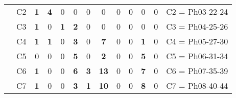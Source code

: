 \begin{table}[H]
{\begin{tabular}{|ccccccccccccc|}
\multicolumn{1}{|c|}{}                                      & \multicolumn{1}{c|}{C2} & \multicolumn{1}{c|}{\textbf{1}} & \multicolumn{1}{c|}{\textbf{4}} & \multicolumn{1}{c|}{0}          & \multicolumn{1}{c|}{0}          & \multicolumn{1}{c|}{0}          & \multicolumn{1}{c|}{0}           & \multicolumn{1}{c|}{0}          & \multicolumn{1}{c|}{0}  & \multicolumn{1}{c|}{0}           & \multicolumn{1}{c|}{0}          & C2 = Ph03-22-24   \\ \cline{2-13}
\multicolumn{1}{|c|}{}                                      & \multicolumn{1}{c|}{C3} & \multicolumn{1}{c|}{\textbf{1}} & \multicolumn{1}{c|}{0}          & \multicolumn{1}{c|}{\textbf{1}} & \multicolumn{1}{c|}{\textbf{2}} & \multicolumn{1}{c|}{0}          & \multicolumn{1}{c|}{0}           & \multicolumn{1}{c|}{0}          & \multicolumn{1}{c|}{0}  & \multicolumn{1}{c|}{0}           & \multicolumn{1}{c|}{0}          & C3 = Ph04-25-26   \\ \cline{2-13}
\multicolumn{1}{|c|}{}                                      & \multicolumn{1}{c|}{C4} & \multicolumn{1}{c|}{\textbf{1}} & \multicolumn{1}{c|}{\textbf{1}} & \multicolumn{1}{c|}{0}          & \multicolumn{1}{c|}{\textbf{3}} & \multicolumn{1}{c|}{0}          & \multicolumn{1}{c|}{\textbf{7}}  & \multicolumn{1}{c|}{0}          & \multicolumn{1}{c|}{0}  & \multicolumn{1}{c|}{\textbf{1}}  & \multicolumn{1}{c|}{0}          & C4 = Ph05-27-30   \\ \cline{2-13}
\multicolumn{1}{|c|}{}                                      & \multicolumn{1}{c|}{C5} & \multicolumn{1}{c|}{0}          & \multicolumn{1}{c|}{0}          & \multicolumn{1}{c|}{0}          & \multicolumn{1}{c|}{\textbf{5}} & \multicolumn{1}{c|}{0}          & \multicolumn{1}{c|}{\textbf{2}}  & \multicolumn{1}{c|}{0}          & \multicolumn{1}{c|}{0}  & \multicolumn{1}{c|}{\textbf{5}}  & \multicolumn{1}{c|}{0}          & C5 = Ph06-31-34   \\ \cline{2-13}
\multicolumn{1}{|c|}{}                                      & \multicolumn{1}{c|}{C6} & \multicolumn{1}{c|}{\textbf{1}} & \multicolumn{1}{c|}{0}          & \multicolumn{1}{c|}{0}          & \multicolumn{1}{c|}{\textbf{6}} & \multicolumn{1}{c|}{\textbf{3}} & \multicolumn{1}{c|}{\textbf{13}} & \multicolumn{1}{c|}{0}          & \multicolumn{1}{c|}{0}  & \multicolumn{1}{c|}{\textbf{7}}  & \multicolumn{1}{c|}{0}          & C6 = Ph07-35-39   \\ \cline{2-13}
\multicolumn{1}{|c|}{}                                      & \multicolumn{1}{c|}{C7} & \multicolumn{1}{c|}{\textbf{1}} & \multicolumn{1}{c|}{0}          & \multicolumn{1}{c|}{0}          & \multicolumn{1}{c|}{\textbf{3}} & \multicolumn{1}{c|}{\textbf{1}} & \multicolumn{1}{c|}{\textbf{10}} & \multicolumn{1}{c|}{0}          & \multicolumn{1}{c|}{0}  & \multicolumn{1}{c|}{\textbf{8}}  & \multicolumn{1}{c|}{0}          & C7 = Ph08-40-44   \\ \cline{2-13}

\end{tabular}}
\end{table}
